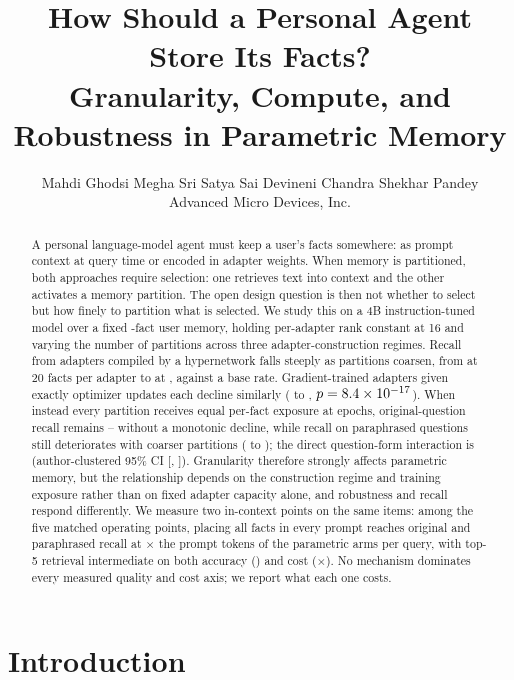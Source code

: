 \documentclass{article}
\title{How Should a Personal Agent Store Its Facts?\\
Granularity, Compute, and Robustness in Parametric Memory}
\author{%
  Mahdi Ghodsi \qquad Megha Sri Satya Sai Devineni \qquad
  Chandra Shekhar Pandey \\
  Advanced Micro Devices, Inc.
}
\begin{document}
\maketitle

\begin{abstract}
A personal language-model agent must keep a user's facts somewhere: as prompt
context at query time or encoded in adapter weights. When memory is partitioned,
both approaches require selection: one retrieves text into context and the other
activates a memory partition. The open design question is then not whether to
select but how finely to partition what is selected. We study this on a 4B instruction-tuned model over a fixed
\NPerArm{}-fact user memory, holding per-adapter rank constant at 16 and varying
the number of partitions across three adapter-construction regimes. Recall from
adapters compiled by a hypernetwork falls steeply as partitions coarsen, from \GTwentyQ{} at
20 facts per adapter to \GTwoHundredQ{} at \NPerArm{}, against a \BaseQ{} base
rate. Gradient-trained adapters given exactly \SeedSteps{} optimizer updates each
decline similarly (\SeedGTwentyQ{} to \SeedGTwoHundredQ{}, $p=8.4\times10^{-17}{}$).
When instead every partition receives equal per-fact exposure at \ExpEpochs{}
epochs, original-question recall remains \ExpQLo{}--\ExpQHi{} without a monotonic
decline, while recall on paraphrased questions still deteriorates with coarser
partitions (\ExpGTwentyPQ{} to \ExpGTwoHundredPQ{}); the direct
question-form interaction is \ExpInteraction{} (author-clustered 95\% CI
[\ExpInteractionCILo{}, \ExpInteractionCIHi{}]). Granularity
therefore strongly affects parametric memory, but the relationship depends on the
construction regime and training exposure rather than on fixed adapter capacity
alone, and robustness and recall respond differently. We measure two in-context
points on the same items: among the five matched operating points,
placing all \NPerArm{} facts in every prompt reaches \FullCtxQ{} original and
\FullCtxPQ{} paraphrased recall at \FullCtxRatio{}$\times$ the prompt tokens of
the parametric arms per query, with top-5 retrieval intermediate on both accuracy
(\RetrQ{}) and cost (\PromptTokenRatio{}$\times$). No mechanism dominates every measured quality and
cost axis; we report what each one costs.
\end{abstract}

\section{Introduction}
\label{sec:intro}
\end{document}
